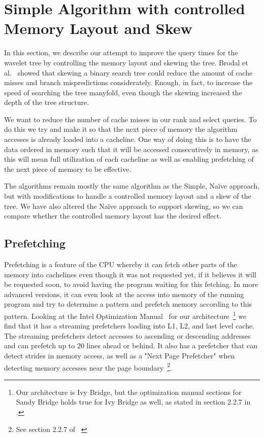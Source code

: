 \section{Simple Algorithm with controlled Memory Layout and Skew}
\label{sec:memorylayout}
In this section, we describe our attempt to improve the query times for the wavelet tree by controlling the memory layout and skewing the tree.
Brodal et al.~\cite{gerthSkewedBinarySearchTrees} showed that skewing a binary search tree could reduce the amount of cache misses and branch mispredictions considerately. Enough, in fact, to increase the speed of searching the tree manyfold, even though the skewing increased the depth of the tree structure.

We want to reduce the number of cache misses in our rank and select queries. To do this we try and make it so that the next piece of memory the algorithm accesses is already loaded into a cacheline. One way of doing this is to have the data ordered in memory such that it will be accessed consecutively in memory, as this will mean full utilization of each cacheline as well as enabling prefetching of the next piece of memory to be effective.

The algorithms remain mostly the same algorithm as the Simple, Naïve approach, but with modifications to handle a controlled memory layout and a skew of the tree.
We have also altered the Naïve approach to support skewing, so we can compare whether the controlled memory layout has the desired effect.

\subsection{Prefetching}
Prefetching is a feature of the CPU whereby it can fetch other parts of the memory into cachelines even though it was not requested yet, if it believes it will be requested soon, to avoid having the program waiting for this fetching.
In more advanced versions, it can even look at the access into memory of the running program and try to determine a pattern and prefetch memory according to this pattern.
Looking at the Intel Optimization Manual~\cite{intel-optimization-manual} for our architecture~\footnote{Our architecture is Ivy Bridge, but the optimization manual sections for Sandy Bridge holds true for Ivy Bridge as well, as stated in section 2.2.7 in \cite{intel-optimization-manual}.} we find that it has a streaming prefetchers loading into L1, L2, and last level cache. The streaming prefetchers detect accesses to ascending or descending addresses and can prefetch up to 20 lines ahead or behind. It also has a prefetcher that can detect strides in memory access, as well as a "Next Page Prefetcher" when detecting memory accesses near the page boundary~\footnote{See section 2.2.7 of ~\cite{intel-optimization-manual}}.


